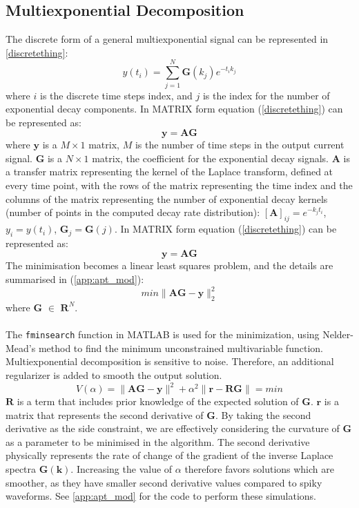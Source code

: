 \begin{appendices}
\subsection{Multiexponential Decomposition}
The discrete form of a general multiexponential signal can be represented in \autoref{discretething}:
\begin{equation}
    y(t_{i}) = \sum_{j=1}^{N} \mathbf{G}(k_{j})e^{-t_{i}k_{j}}
    \label{discretething}
\end{equation}
where $i$ is the discrete time steps index, and $j$ is the index for the number of exponential decay components. In MATRIX form equation (\autoref{discretething}) can be represented as:
$$ \mathbf{y = AG} $$
where $ \mathbf{y}$ is a $M\times 1$ matrix, $M$ is the number of time steps in the output current signal. $\mathbf{G}$ is a $N\times 1$ matrix, the coefficient for the exponential decay signals. $\mathbf{A}$ is a transfer matrix representing the kernel of the Laplace
transform, defined at every time point, with the rows of the matrix representing the time index and the columns of the matrix representing the number of exponential decay kernels (number of points in the computed decay rate distribution): $ [\mathbf{A}]_{ij} = e^{-k_{j}t_{i}} $, $y_{i} = y(t_{i}) $, $\mathbf{G}_{j} = \mathbf{G}(j)$.
In MATRIX form equation (\autoref{discretething}) can be represented as:
$$ \mathbf{y = AG} $$
The minimisation becomes a linear least squares problem, and the details are summarised in (\autoref{app:apt_mod}):
\begin{equation}
    min\lVert \mathbf{AG} - \mathbf{y}\lVert^{2}_{2}
\end{equation}
where $\mathbf{G}$ $\in$ $\mathbf{R}^{N}$.\\\\
The \texttt{fminsearch} function in MATLAB is used for the minimization, using Nelder-Mead's method to find the minimum unconstrained multivariable function.
Multiexponential decomposition is sensitive to noise. Therefore, an additional regularizer is added to smooth the output solution.
\begin{equation}
    V(\alpha) = \lVert \mathbf{AG} - \mathbf{y}\lVert^{2}+\alpha^{2}\lVert \mathbf{r} - \mathbf{RG}\lVert  = min
\end{equation}
$\mathbf{R}$ is a term that includes prior knowledge of the expected solution of $\mathbf{G}$. $\mathbf{r}$ is a matrix that represents the second derivative of $\mathbf{G}$. By taking the second derivative as the side constraint, we are effectively considering the curvature of $\mathbf{G}$ as a parameter to be minimised in the algorithm. The second derivative physically represents the rate of change of the gradient of the inverse Laplace spectra $\mathbf{G(k)}$. Increasing the value of $\alpha$ therefore favors solutions which are smoother, as they have smaller second derivative values compared to spiky waveforms. See \autoref{app:apt_mod} for the code to perform these simulations.\\\\
\clearpage

\end{appendices}
